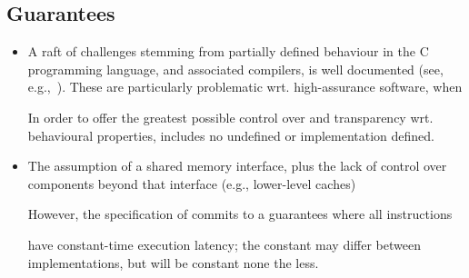 
\subsection{Guarantees}
\label{sec:bg:guarantee}

\begin{itemize}

\item A raft of challenges stemming from partially defined behaviour in the
      C programming language, and associated compilers, is well documented
      (see, e.g.,~\cite[Section 2.1]{SCARV:SimChiAnd:18}).
      These are particularly problematic wrt. high-assurance software, when


      In order to offer the greatest possible control over and transparency
      wrt. behavioural properties, \XCID includes no undefined or implementation defined.

\item The assumption of a shared memory interface, plus the lack of control
      over components beyond that interface (e.g., lower-level caches)

      However, the specification of \XCID commits to a guarantees where all
      instructions 

      have constant-time execution latency; the constant may differ between
      implementations, but will be constant none the less.

\end{itemize}

